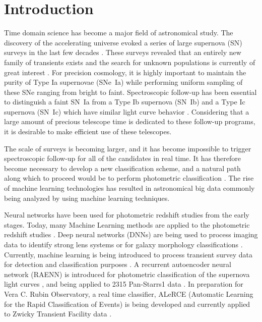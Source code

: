 \documentclass[useamsfonts]{pasj01}
\begin{document}
\section{Introduction}
Time domain science has become a major field of astronomical study. The discovery of the accelerating universe \citep{perlmutter99a,riess98a} evoked a series of large supernova (SN) surveys in the last few decades 
\citep{betoule14a,scolnic18a,brout19a}.    
These surveys revealed that an entirely new family of transients exists and the search for unknown populations is currently of great interest \citep{howell06a,phillips07a,quimby07b}.
For precision cosmology, it is highly important to maintain the purity of Type Ia supernovae (SNe~Ia) while performing uniform sampling of these SNe ranging from bright to faint. 
Spectroscopic follow-up has been essential to distinguish a faint SN~Ia from a Type Ib supernova (SN~Ib) and a Type Ic supernova (SN~Ic) which have similar light curve behavior \citep{scolnic14a}. 
Considering that a large amount of precious telescope time is dedicated to these follow-up programs, it is desirable to make efficient use of these telescopes.

The scale of surveys is becoming larger, and it has become impossible to trigger spectroscopic follow-up for all of the candidates in real time. It has therefore become necessary to develop a new classification scheme, and a natural path along which to proceed would be to perform photometric classification \citep{sako11a,jonesl8a}. The rise of machine learning technologies has resulted in astronomical big data commonly being analyzed by using machine learning techniques.

Neural networks have been used for photometric redshift studies from the early stages. 
Today, many Machine Learning methods are applied to the photometric redshift studies \citep{collister04a,carliles10a,pasquet19a}.
Deep neural networks (DNNs) are being used to process imaging data to identify strong lens systems \citep{petrillo17a} or for galaxy morphology classifications \citep{hausen19a}. 
Currently, machine learning is being introduced to process transient survey data for detection \citep{goldstein15a} and classification purposes \citep{charnock17a}.
A recurrent autoencoder neural network (RAENN) is introduced for photometric classification of the supernova light curves \citep{villar20a}, and being applied to 2315 Pan-Starrs1 data \citep{hosseinzadeh20a}.  
In preparation for Vera C. Rubin Observatory, a real time classifier, ALeRCE (Automatic Learning for the Rapid Classification of Events) is being developed \citep{sanchez-saez20a,forster20a} and currently applied to Zwicky Transient Facility data \citep{carrasco-davis20a}.
\end{document}
